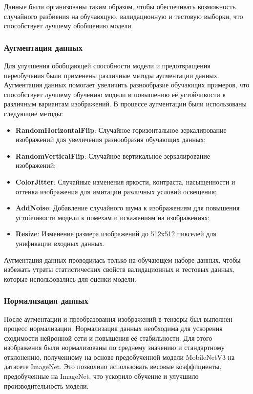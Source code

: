 {    Данные были организованы таким образом, чтобы обеспечивать возможность случайного разбиения на обучающую, валидационную и тестовую выборки, что способствует лучшему обобщению модели.

    \subsubsection*{Аугментация данных}

    Для улучшения обобщающей способности модели и предотвращения переобучения были применены различные методы аугментации данных. Аугментация данных помогает увеличить разнообразие обучающих примеров, что способствует лучшему обучению модели и повышению её устойчивости к различным вариантам изображений. В процессе аугментации были использованы следующие методы:
    \begin{itemize}
        \item \textbf{RandomHorizontalFlip}: Случайное горизонтальное зеркалирование изображений для увеличения разнообразия обучающих данных;
        \item \textbf{RandomVerticalFlip}: Случайное вертикальное зеркалирование изображений;
        \item \textbf{ColorJitter}: Случайные изменения яркости, контраста, насыщенности и оттенка изображения для имитации различных условий освещения;
        \item \textbf{AddNoise}: Добавление случайного шума к изображениям для повышения устойчивости модели к помехам и искажениям на изображениях;
        \item \textbf{Resize}: Изменение размера изображений до 512x512 пикселей для унификации входных данных.
    \end{itemize}

    Аугментация данных проводилась только на обучающем наборе данных, чтобы избежать утраты статистических свойств валидационных и тестовых данных, которые использовались для оценки модели.

    \subsubsection*{Нормализация данных}

    После аугментации и преобразования изображений в тензоры был выполнен процесс нормализации. Нормализация данных необходима для ускорения сходимости нейронной сети и повышения её стабильности. Для этого изображения были нормализованы по среднему значению и стандартному отклонению, полученному на основе предобученной модели MobileNetV3 на датасете ImageNet. Это позволило использовать весовые коэффициенты, предобученные на ImageNet, что ускорило обучение и улучшило производительность модели.

}

